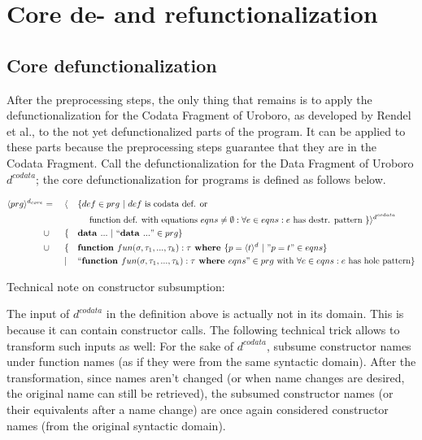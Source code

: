 \section{Core de- and refunctionalization}

\subsection{Core defunctionalization}

After the preprocessing steps, the only thing that remains is to apply the defunctionalization for the Codata Fragment of Uroboro, as developed by Rendel et al., to the not yet defunctionalized parts of the program. It can be applied to these parts because the preprocessing steps guarantee that they are in the Codata Fragment. Call the defunctionalization for the Data Fragment of Uroboro $d^{codata}$; the core defunctionalization for programs is defined as follows below.

\begin{alignat*}{3}
\langle prg \rangle^{d_{core}} & = ~&& \langle && \{ def \in prg ~ | ~ def \textrm{ is codata def. or} \\ & && &&\quad \textrm{ function def. with equations } eqns \neq \emptyset: \forall e \in eqns: e \textrm{ has destr. pattern } \} \rangle^{d^{codata}} \\
& \cup && \{ && \textrm{\textbf{data }} ... ~ | ~ `` \textrm{\textbf{data }} ... " \in prg \} \\
& \cup && \{ && \textrm{\textbf{function }} fun(\sigma, \tau_1, ..., \tau_k): \tau \textrm{\textbf{ where }} \{ p = \langle t \rangle^d ~ | ~ "p = t" \in eqns \} \\
& && | && `` \textrm{\textbf{function }} fun(\sigma, \tau_1, ..., \tau_k): \tau \textrm{\textbf{ where }} eqns " \in prg \textrm{ with } \forall e \in eqns: e \textrm{ has hole pattern}\} 
\end{alignat*}

Technical note on constructor subsumption:

The input of $d^{codata}$ in the definition above is actually not in its domain. This is because it can contain constructor calls. The following technical trick allows to transform such inputs as well: For the sake of $d^{codata}$, subsume constructor names under function names (as if they were from the same syntactic domain). After the transformation, since names aren't changed (or when name changes are desired, the original name can still be retrieved), the subsumed constructor names (or their equivalents after a name change) are once again considered constructor names (from the original syntactic domain).

